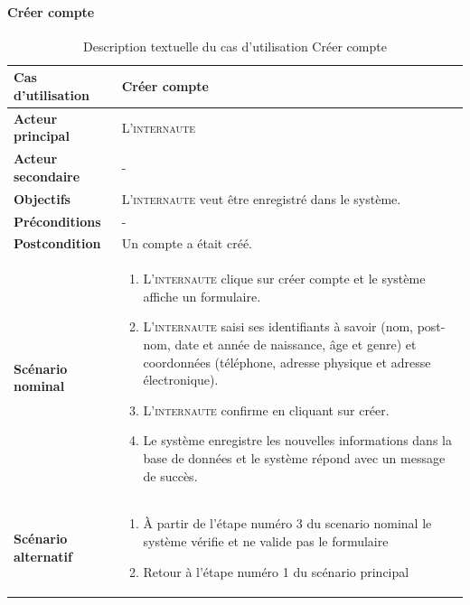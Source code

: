         \paragraph[Créer compte]{Créer compte}
            \begin{longtable}{p{4cm} p{9cm}}
                \caption{Description textuelle du cas d’utilisation Créer compte}
                \label{table:usecaseCreeCompte}
                \\\hline\hline
                    \textbf{Cas d’utilisation} & \textbf{Créer compte}
                \\\hline\hline
                        \textbf{Acteur principal} & L’\textsc{internaute}
                    \\
                        \textbf{Acteur secondaire} & -
                    \\
                        \textbf{Objectifs} & L’\textsc{internaute} veut être 
                        enregistré dans le système.
                    \\
                        \textbf{Préconditions} & -
                    \\
                        \textbf{Postcondition} & Un compte a était créé.
                    \\
                        \textbf{Scénario nominal} &
                            \begin{enumerate}[leftmargin=*]
                                \item L’\textsc{internaute} clique sur créer compte et le
                                système affiche un formulaire.
                                \item L’\textsc{internaute} saisi ses identifiants à savoir
                                (nom, post-nom, date et année de
                                naissance, âge et genre) et coordonnées (téléphone, adresse physique
                                et adresse électronique).
                                \item L’\textsc{internaute} confirme en cliquant sur créer.
                                \item Le système enregistre les nouvelles informations
                                dans la base de données et le
                                système répond avec un message de succès.
                            \end{enumerate}
                    \\
                        \textbf{Scénario alternatif} &
                            \begin{enumerate}[leftmargin=*]
                                \item À partir de l’étape numéro 3 du scenario nominal
                                le système vérifie et ne valide pas le formulaire
                                \item Retour à l’étape numéro 1 du scénario principal
                            \end{enumerate}
                \\\bottomrule
            \end{longtable}

